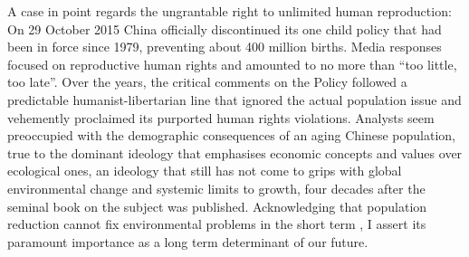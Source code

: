 \documentclass[10pt,a4paper]{article}
\begin{document}
\begin{multicols}{2}

A case in point regards the ungrantable right to unlimited human reproduction: On 29 October 2015 China officially discontinued its one child policy that had been in force since 1979, preventing about 400 million births. Media responses focused on reproductive human rights and amounted to no more than ``too little, too late''. Over the years, the critical comments on the Policy followed a predictable humanist-libertarian line that ignored the actual population issue and vehemently proclaimed its purported human rights violations. Analysts seem preoccupied with the demographic consequences of an aging Chinese population, true to the dominant ideology that emphasises economic concepts and values over ecological ones, an ideology that still has not come to grips with global environmental change and systemic limits to growth, four decades after the seminal book on the subject was published. Acknowledging that population reduction cannot fix environmental problems in the short term \citep{r11}, I assert its paramount importance as a long term determinant of our future.



\end{multicols}
\end{document}

